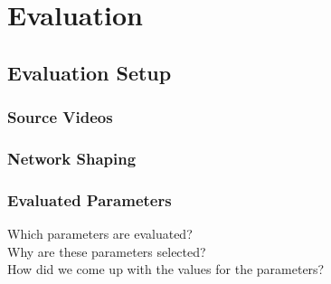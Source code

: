 \chapter{Evaluation} \label{chapter:Evaluation}

	
\section{Evaluation Setup}


\subsection{Source Videos}


\subsection{Network Shaping}


\subsection{Evaluated Parameters}
Which parameters are evaluated? \\
Why are these parameters selected? \\
How did we come up with the values for the parameters? \\

